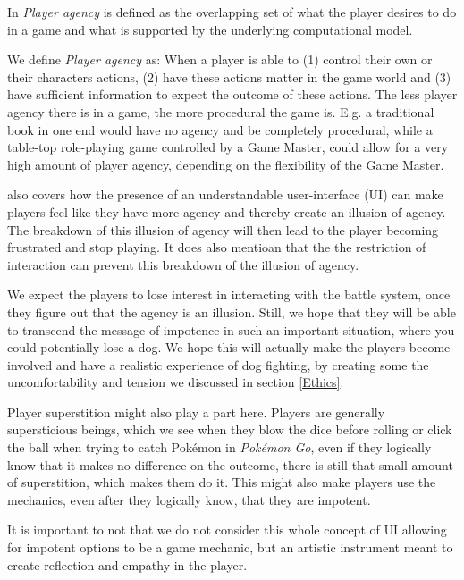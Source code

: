 In \cite{wardrip2009agency} \textit{Player agency} is defined as the overlapping set of what the player desires to do in a game and what is supported by the underlying computational model.\

We define \textit{Player agency} as: When a player is able to (1) control their own or their characters actions, (2) have these actions matter in the game world and (3) have sufficient information to expect the outcome of these actions. The less player agency there is in a game, the more procedural the game is. E.g. a traditional book in one end would have no agency and be completely procedural, while a table-top role-playing game controlled by a Game Master, could allow for a very high amount of player agency, depending on the flexibility of the Game Master.\

\cite{wardrip2009agency} also covers how the presence of an understandable user-interface (UI) can make players feel like they have more agency and thereby create an illusion of agency. The breakdown of this illusion of agency will then lead to the player becoming frustrated and stop playing. It does also mentioan that the the restriction of interaction can prevent this breakdown of the illusion of agency.\

We expect the players to lose interest in interacting with the battle system, once they figure out that the agency is an illusion. Still, we hope that they will be able to transcend the message of impotence in such an important situation, where you could potentially lose a dog. 
We hope this will actually make the players become involved and have a realistic experience of dog fighting, by creating some the uncomfortability and tension we discussed in section \ref{Ethics}.\

Player superstition might also play a part here. Players are generally supersticious beings, which we see when they blow the dice before rolling or click the ball when trying to catch Pok{\'e}mon in \textit{Pok{\'e}mon Go}, even if they logically know that it makes no difference on the outcome, there is still that small amount of superstition, which makes them do it. This might also make players use the mechanics, even after they logically know, that they are impotent.\

It is important to not that we do not consider this whole concept of UI allowing for impotent options to be a game mechanic, but an artistic instrument meant to create reflection and empathy in the player. \
